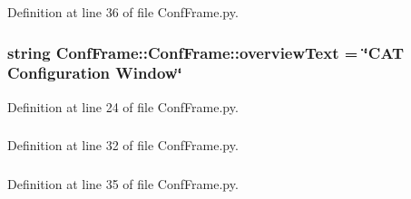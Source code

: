 Definition at line 36 of file ConfFrame.py.\hypertarget{classConfFrame_1_1ConfFrame_a7612044f4be1f155ce4afaec7557ee06}{
\subsubsection[{overviewText}]{\setlength{\rightskip}{0pt plus 5cm}string {\bf ConfFrame::ConfFrame::overviewText} = \char`\"{}CAT Configuration Window\char`\"{}}}
\label{classConfFrame_1_1ConfFrame_a7612044f4be1f155ce4afaec7557ee06}


Definition at line 24 of file ConfFrame.py.\hypertarget{classConfFrame_1_1ConfFrame_a905bcda3bacd957ba2b30b2ce5523bc8}{
\subsubsection[{panel}]{}}
\label{classConfFrame_1_1ConfFrame_a905bcda3bacd957ba2b30b2ce5523bc8}


Definition at line 32 of file ConfFrame.py.\hypertarget{classConfFrame_1_1ConfFrame_a7eb564d4c46ee0939ace2b8204e731a5}{
\subsubsection[{panels}]{}}
\label{classConfFrame_1_1ConfFrame_a7eb564d4c46ee0939ace2b8204e731a5}


Definition at line 35 of file ConfFrame.py.\hypertarget{classConfFrame_1_1ConfFrame_a3f4dddac5f153d89adecc0f17e8c101d}{
\subsubsection[{parent}]{}}
\label{classConfFrame_1_1ConfFrame_a3f4dddac5f153d89adecc0f17e8c101d}


